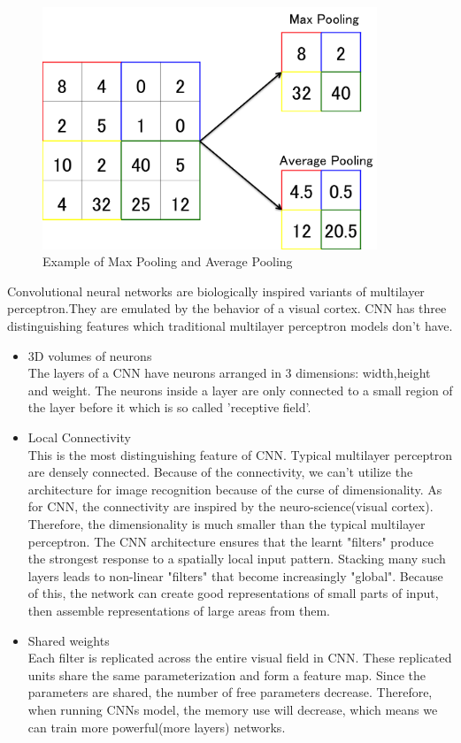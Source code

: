 \begin{figure}[H]

	\begin{center}
	\includegraphics[width=10cm]{picture/Pooling.png}
	\caption{Example of Max Pooling and Average Pooling}
	\end{center}
	\label{fig:seven}

\end{figure}

 

Convolutional neural networks are biologically inspired variants of multilayer perceptron.They are emulated by the behavior of a visual cortex. CNN has three distinguishing features which traditional multilayer perceptron models don't have.\cite{cnn}

\begin{itemize}
 \item 3D volumes of neurons\\
 The layers of a CNN have neurons arranged in 3 dimensions: width,height and weight. The neurons inside a layer are only connected to a small region of the layer before it which is so called 'receptive field'.
 \item Local Connectivity\\
 This is the most distinguishing feature of CNN. Typical multilayer perceptron are densely connected. Because of the connectivity,  we can't utilize the architecture for image recognition because of the curse of dimensionality. As for CNN, the connectivity are inspired by the neuro-science(visual cortex). Therefore, the dimensionality is much smaller than the typical multilayer perceptron. The CNN architecture ensures that the learnt "filters" produce the strongest response to a spatially local input pattern. Stacking many such layers leads to non-linear "filters" that become increasingly "global". Because of this, the network can create good representations of small parts of input, then assemble representations of large areas from them.
 \item Shared weights\\
 Each filter is replicated across the entire visual field in CNN. These replicated units share the same parameterization and form a feature map. Since the parameters are shared, the number of free parameters decrease. Therefore, when running CNNs model, the memory use will decrease, which means we can train more powerful(more layers) networks.
\end{itemize}




